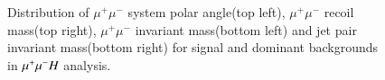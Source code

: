 \begin{figure}[!htpb]
\label{fig:kinematic_mumuh}
\centering
{}
\caption{Distribution of $\mu^+\mu^-$ system polar angle(top left), $\mu^+\mu^-$ recoil mass(top right), $\mu^+\mu^-$ invariant mass(bottom left) and jet pair invariant mass(bottom right) for signal and dominant backgrounds in $\mu^{+}\mu^{-}H$ analysis.}
\end{figure}

